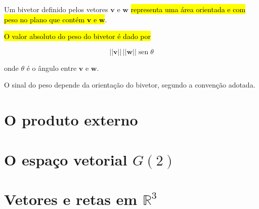 \documentclass[
  letterpaper,
  DIV=11,
  numbers=noendperiod]{scrreprt}
\DeclareMathOperator{\sen}{\text{sen}}
\begin{document}
\begin{itemize}
  \begin{tcolorbox}[standard jigsaw,toprule=.15mm, bottomrule=.15mm, bottomtitle=1mm, opacityback=0, coltitle=black, toptitle=1mm, title=\textcolor{quarto-callout-note-color}{\faInfo}\hspace{0.5em}{Resumindo: bivetores \(=\) áreas orientadas e com peso}, opacitybacktitle=0.6, left=2mm, titlerule=0mm, arc=.35mm, colbacktitle=quarto-callout-note-color!10!white, colback=white, rightrule=.15mm, leftrule=.75mm, colframe=quarto-callout-note-color-frame]
  Um bivetor definido pelos vetores $\mathbf{v}$ e $\mathbf{w}$
  {\hl{representa uma área orientada e com peso no plano que contém
  $\mathbf{v}$ e $\mathbf{w}$}}.

  {\hl{O valor absoluto do peso do bivetor é dado por}}

  \[
  ||\mathbf{v}||\, ||\mathbf{w}|| \sen \theta
  \]

  onde $\theta$ é o ângulo entre $\mathbf{v}$ e $\mathbf{w}$.

  O sinal do peso depende da orientação do bivetor, segundo a convenção
  adotada.
  \end{tcolorbox}
\end{itemize}

\hypertarget{o-produto-externo}{%
\section{O produto externo}\label{o-produto-externo}}

\hypertarget{o-espauxe7o-vetorial-g2}{%
\section{\texorpdfstring{O espaço vetorial
$G(2)$}{O espaço vetorial }}\label{o-espauxe7o-vetorial-g2}}

\hypertarget{vetores-e-retas-em-mathbbr3}{%
\section{\texorpdfstring{Vetores e retas em
$\mathbb{R}^3$}{Vetores e retas em }}\label{vetores-e-retas-em-mathbbr3}}
\end{document}
